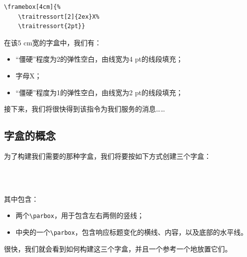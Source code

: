 \begin{codelist}[10.18]{
}\begin{verbatim}
\framebox[4cm]{%
    \traitressort[2]{2ex}X%
    \traitressort{2pt}}
\end{verbatim}
\end{codelist}

在该5 cm宽的字盒中，我们有：

\begin{itemize}
    \item “僵硬”程度为2的弹性空白，由线宽为4 pt的线段填充；
    \item 字母X；
    \item “僵硬”程度为1的弹性空白，由线宽为2 pt的线段填充；
\end{itemize}

接下来，我们将很快得到该指令为我们服务的消息……

\subsection{字盒的概念}

为了构建我们需要的那种字盒，我们将要按如下方式创建三个字盒：

\begin{center}
    \fbox{\parbox{3pt}{%
        \rule{0pt}{1.215cm}%
        \rule{3pt}{1.025cm}}}%
    \parbox[][1.5cm][c]{4cm}{%
        \begin{flushleft}
          \\\nointerlineskip
          \\\nointerlineskip
          \framebox[4cm]{\traitressort{3pt}}
        \end{flushleft}}%
    \fbox{\parbox{3pt}{%
        \rule{0pt}{1.215cm}%
        \rule{3pt}{1.025cm}}}
\end{center}

其中包含：

\begin{itemize}
    \item 两个\verb|\parbox|，用于包含左右两侧的竖线；
    \item 中央的一个\verb|\parbox|，包含响应标题变化的横线、内容，以及底部的水平线。
\end{itemize}

很快，我们就会看到如何构建这三个字盒，并且一个参考一个地放置它们。

